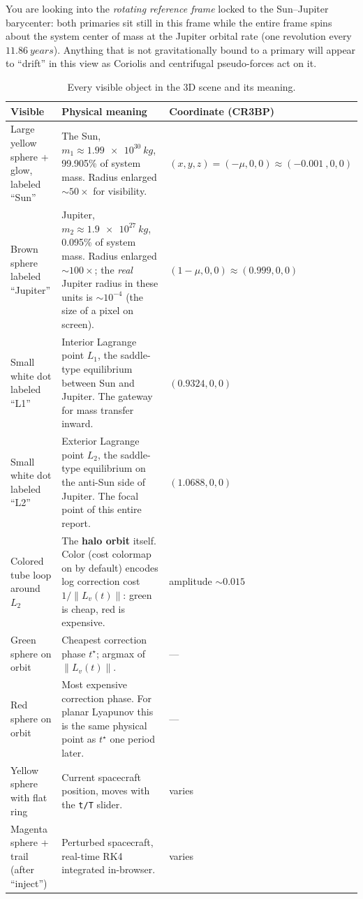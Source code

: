 \documentclass[11pt,a4paper]{article}
\begin{document}
You are looking into the \emph{rotating reference frame} locked to the Sun--Jupiter barycenter: both primaries sit still in this frame while the entire frame spins about the system center of mass at the Jupiter orbital rate (one revolution every $\SI{11.86}{years}$). Anything that is not gravitationally bound to a primary will appear to ``drift'' in this view as Coriolis and centrifugal pseudo-forces act on it.

\begin{table}[H]
\centering
\small
\caption{Every visible object in the 3D scene and its meaning.}
\begin{tabularx}{\textwidth}{@{}l X l@{}}
\toprule
\textbf{Visible} & \textbf{Physical meaning} & \textbf{Coordinate (CR3BP)} \\
\midrule
Large yellow sphere + glow, labeled ``Sun'' & The Sun, $m_1 \approx \SI{1.99e30}{kg}$, 99.905\% of system mass. Radius enlarged $\sim 50\times$ for visibility. & $(x,y,z) = (-\mu, 0, 0) \approx (-\SI{0.001}{}, 0, 0)$ \\
Brown sphere labeled ``Jupiter'' & Jupiter, $m_2 \approx \SI{1.9e27}{kg}$, 0.095\% of system mass. Radius enlarged $\sim 100\times$; the \emph{real} Jupiter radius in these units is $\sim 10^{-4}$ (the size of a pixel on screen). & $(1-\mu, 0, 0) \approx (0.999, 0, 0)$ \\
Small white dot labeled ``L1'' & Interior Lagrange point $L_1$, the saddle-type equilibrium between Sun and Jupiter. The gateway for mass transfer inward. & $(0.9324, 0, 0)$ \\
Small white dot labeled ``L2'' & Exterior Lagrange point $L_2$, the saddle-type equilibrium on the anti-Sun side of Jupiter. The focal point of this entire report. & $(1.0688, 0, 0)$ \\
Colored tube loop around $L_2$ & The \textbf{halo orbit} itself. Color (cost colormap on by default) encodes log correction cost $1/\|L_v(t)\|$: green is cheap, red is expensive. & amplitude $\sim 0.015$ \\
Green sphere on orbit & Cheapest correction phase $t^\star$; argmax of $\|L_v(t)\|$. & --- \\
Red sphere on orbit & Most expensive correction phase. For planar Lyapunov this is the same physical point as $t^\star$ one period later. & --- \\
Yellow sphere with flat ring & Current spacecraft position, moves with the \texttt{t/T} slider. & varies \\
Magenta sphere + trail (after ``inject'') & Perturbed spacecraft, real-time RK4 integrated in-browser. & varies \\

\end{tabularx}
\end{table}
\end{document}
